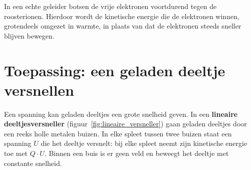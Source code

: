 \documentclass{ximera}
\begin{document}
\begin{remark}[expandable=true,title={In de praktijk}]\nl
In een echte geleider botsen de vrije elektronen voortdurend tegen de roosterionen. Hierdoor wordt de kinetische energie die de elektronen winnen, grotendeels omgezet in warmte, in plaats van dat de elektronen steeds sneller blijven bewegen.
\end{remark}

\section{Toepassing: een geladen deeltje versnellen}
Een spanning kan geladen deeltjes een grote snelheid geven. In een \textbf{lineaire deeltjesversneller} (figuur~\ref{fig:lineaire_versneller}) gaan geladen deeltjes door een reeks holle metalen buizen. In elke spleet tussen twee buizen staat een spanning $U$ die het deeltje versnelt: bij elke spleet neemt zijn kinetische energie toe met $Q \cdot U$. Binnen een buis is er geen veld en beweegt het deeltje met constante snelheid.
\end{document}
